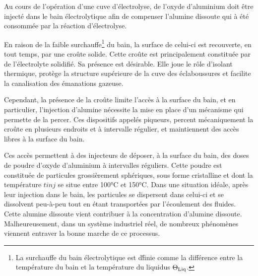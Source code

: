 
Au cours de l'opération d'une cuve d'électrolyse, de l'oxyde
d'aluminium doit être injecté dans le bain électrolytique afin
de compenser l'alumine dissoute qui à été consommée par la
réaction d'électrolyse.

En raison de la faible surchauffe\footnote{La surchauffe du bain
  électrolytique est d\'finie comme la différence entre la température
  du bain et la température du liquidus $\Theta_\text{Liq}$.} du bain, la surface
de celui-ci est recouverte, en tout temps, par une croûte
solide. Cette croûte est principalement constituée par de
l'électrolyte solidifié. Sa présence est
désirable. Elle joue le rôle d'isolant thermique, protège la structure
supérieure de la cuve des éclaboussures et facilite la canalisation
des émanations gazeuse.

Cependant, la présence de la croûte limite l'accès à la surface du
bain, et en particulier, l'injection d'alumine nécessite la mise en
place d'un mécanisme qui permette de la percer. Ces dispositifs
appelés piqueurs, percent mécaniquement la croûte en plusieurs
endroits et à intervalle régulier, et maintiennent des accès libres à
la surface du bain.

Ces accès permettent à des injecteurs de déposer, à la surface du
bain, des doses de poudre d'oxyde d'aluminium à intervalles
réguliers. Cette poudre est constituée de particules grossièrement
sphériques, sous forme cristalline et dont la température $tinj$ se
situe entre \num{100}\si{\celsius} et \num{150}\si{\celsius}.
Dans une situation idéale, après leur injection dans le bain, les
particules se dispersent dans celui-ci et se dissolvent peu-à-peu tout
en étant transportées par l'écoulement des fluides. Cette alumine
dissoute vient contribuer à la concentration d'alumine
dissoute. Malheureusement, dans un système industriel réel, de
nombreux phénomènes viennent entraver la bonne marche de ce processus.


